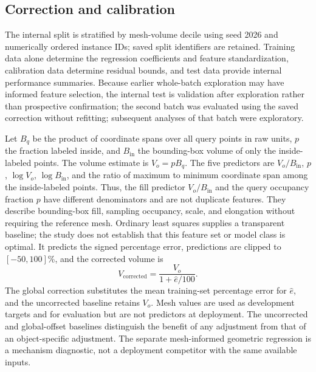 \documentclass[journal]{IEEEtran}
\begin{document}
\subsection{Correction and calibration}

The internal split is stratified by mesh-volume decile using seed 2026 and numerically ordered instance IDs; saved split identifiers are retained. Training data alone determine the regression coefficients and feature standardization, calibration data determine residual bounds, and test data provide internal performance summaries. Because earlier whole-batch exploration may have informed feature selection, the internal test is validation after exploration rather than prospective confirmation; the second batch was evaluated using the saved correction without refitting; subsequent analyses of that batch were exploratory.

Let $B_q$ be the product of coordinate spans over all query points in raw units, $p$ the fraction labeled inside, and $B_{\mathrm{in}}$ the bounding-box volume of only the inside-labeled points. The volume estimate is $V_o=pB_q$. The five predictors are $V_o/B_{\mathrm{in}}$, $p$, $\log V_o$, $\log B_{\mathrm{in}}$, and the ratio of maximum to minimum coordinate span among the inside-labeled points. Thus, the fill predictor $V_o/B_{\mathrm{in}}$ and the query occupancy fraction $p$ have different denominators and are not duplicate features. They describe bounding-box fill, sampling occupancy, scale, and elongation without requiring the reference mesh. Ordinary least squares supplies a transparent baseline; the study does not establish that this feature set or model class is optimal. It predicts the signed percentage error, predictions are clipped to $[-50,100]$\%, and the corrected volume is
\begin{equation}
V_{\mathrm{corrected}}=\frac{V_o}{1+\widehat{e}/100}.
\end{equation}
The global correction substitutes the mean training-set percentage error for $\widehat{e}$, and the uncorrected baseline retains $V_o$. Mesh values are used as development targets and for evaluation but are not predictors at deployment. The uncorrected and global-offset baselines distinguish the benefit of any adjustment from that of an object-specific adjustment. The separate mesh-informed geometric regression is a mechanism diagnostic, not a deployment competitor with the same available inputs.
\end{document}
